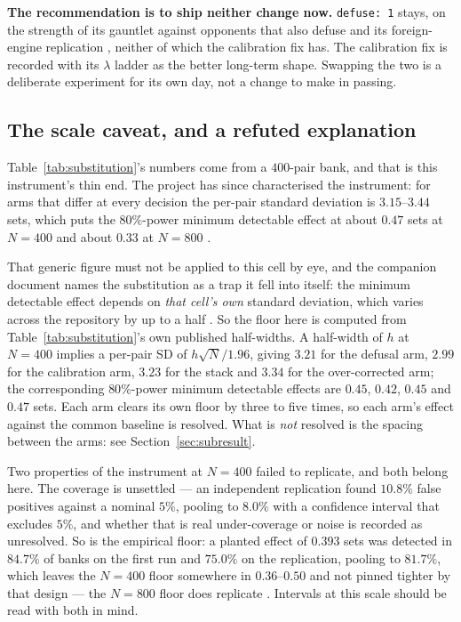 \documentclass[11pt]{article}
\newcommand{\code}[1]{\texttt{#1}}
\begin{document}
\textbf{The recommendation is to ship neither change now.} \mbox{\code{defuse: 1}} stays, on the
strength of its gauntlet against opponents that also defuse and its foreign-engine
replication \cite{concession,crossplay}, neither of which the calibration fix has. The
calibration fix is recorded with its $\lambda$ ladder as the better long-term shape.
Swapping the two is a deliberate experiment for its own day, not a change to make in
passing.

\subsection{The scale caveat, and a refuted explanation}
\label{sec:scale}

Table~\ref{tab:substitution}'s numbers come from a $400$-pair bank, and that is this
instrument's thin end. The project has since characterised the instrument: for arms that
differ at every decision the per-pair standard deviation is $3.15$--$3.44$ sets, which
puts the $80\%$-power minimum detectable effect at about $0.47$ sets at $N = 400$ and
about $0.33$ at $N = 800$ \cite{concession}.

That generic figure must not be applied to this cell by eye, and the companion document
names the substitution as a trap it fell into itself: the minimum detectable effect
depends on \emph{that cell's own} standard deviation, which varies across the repository
by up to a half \cite{concession}. So the floor here is computed from
Table~\ref{tab:substitution}'s own published half-widths. A half-width of $h$ at
$N = 400$ implies a per-pair SD of $h\sqrt{N}/1.96$, giving $3.21$ for the defusal arm,
$2.99$ for the calibration arm, $3.23$ for the stack and $3.34$ for the over-corrected
arm; the corresponding $80\%$-power minimum detectable effects are $0.45$, $0.42$, $0.45$
and $0.47$ sets. Each arm clears its own floor by three to five times, so each
arm's effect against the common baseline is resolved. What is \emph{not} resolved is the
spacing between the arms: see Section~\ref{sec:subresult}.

Two properties of the instrument at $N = 400$ failed to replicate, and both belong here.
The coverage is unsettled --- an independent replication found $10.8\%$ false positives
against a nominal $5\%$, pooling to $8.0\%$ with a confidence interval that excludes
$5\%$, and whether that is real under-coverage or noise is recorded as unresolved. So is
the empirical floor: a planted effect of $0.393$ sets was detected in $84.7\%$ of banks on
the first run and $75.0\%$ on the replication, pooling to $81.7\%$, which leaves the
$N = 400$ floor somewhere in $0.36$--$0.50$ and not pinned tighter by that design ---
the $N = 800$ floor does replicate \cite{concession}. Intervals at this scale should be
read with both in mind.
\end{document}
